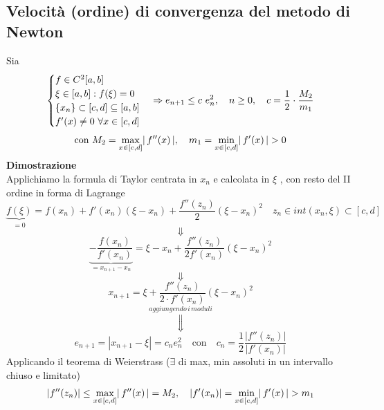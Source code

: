 \subsection{Velocità (ordine) di convergenza del metodo di Newton}
Sia
\[
\begin{cases}
f\in C^2[a,b]\\
\xi \in [a,b] : f(\xi) = 0\\
\{x_n\} \subset [c,d] \subseteq [a,b]\\
f'(x) \neq 0$ $\forall x\in [c,d]
\end{cases}
\Rightarrow e_{n+1} \le c\ e_n^2, \quad n\ge0, \quad c = \frac{1}{2} \cdot \frac{M_2}{m_1}
\]
\[\text{con } M_2 = \max_{x\in[c,d]}\abs{\,f''(x)\,}, \quad m_1 = \min_{x\in[c,d]}\abs{\,f'(x)\,} > 0\]
\textbf{Dimostrazione}\\
Applichiamo la formula di Taylor centrata in $x_n$ e calcolata in $\xi $ , con resto del II ordine in forma di Lagrange
\[\underbrace{f(\xi)}_{=0}=f(x_n)+f'(x_n)(\xi-x_n)+\frac{f''(z_n)}{2}(\xi-x_n)^2 \quad z_n\in int(x_n,\xi)\subset [c,d]\]
\[\Downarrow\]
\[\underbrace{-\frac{f(x_n)}{f'(x_n)}}_{= x_{n+1}-x_n}=\xi-x_n+\frac{f''(z_n)}{2f'(x_n)}(\xi-x_n)^2\]
\[\Downarrow\]
\[x_{n+1}=\xi+\frac{f''(z_n)}{2\cdot f'(x_n)}(\xi-x_n)^2\]
\[\overset{aggiungendo\,i\,moduli}{\Downarrow}\]
\[e_{n+1}=|x_{n+1}-\xi|=c_ne_n^2 \quad \text{con} \quad c_n=\frac{1}{2}\frac{|f''(z_n)|}{|f'(x_n)|}\]
Applicando il teorema di Weierstrass ($\exists$ di max, min assoluti in un intervallo chiuso e limitato)
\[\abs*{f''(z_n)}\leq \max_{x\in[c,d]}\abs{\,f''(x)\,}=M_2,\quad \abs*{f'(x_n)} = \min_{x\in[c,d]}\abs{\,f'(x)\,} > m_1\]